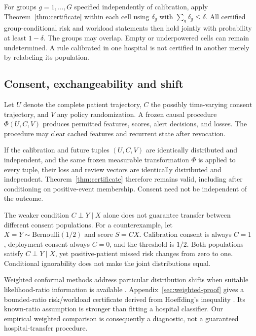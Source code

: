 \begin{corollary}
For groups $g=1,\ldots,G$ specified independently of calibration, apply Theorem~\ref{thm:certificate} within each cell using $\delta_g$ with $\sum_g\delta_g\le\delta$. All certified group-conditional risk and workload statements then hold jointly with probability at least $1-\delta$. The groups may overlap. Empty or underpowered cells can remain undetermined. A rule calibrated in one hospital is not certified in another merely by relabeling its population.
\end{corollary}

\subsection{Consent, exchangeability and shift}
Let $U$ denote the complete patient trajectory, $C$ the possibly time-varying consent trajectory, and $V$ any policy randomization. A frozen causal procedure $\Phi(U,C,V)$ produces permitted features, scores, alert decisions, and losses. The procedure may clear cached features and recurrent state after revocation.

\begin{proposition}\label{prop:consent}
If the calibration and future tuples $(U,C,V)$ are identically distributed and independent, and the same frozen measurable transformation $\Phi$ is applied to every tuple, their loss and review vectors are identically distributed and independent. Theorem~\ref{thm:certificate} therefore remains valid, including after conditioning on positive-event membership. Consent need not be independent of the outcome.
\end{proposition}
The weaker condition $C\perp Y\mid X$ alone does not guarantee transfer between different consent populations. For a counterexample, let $X=Y\sim\mathrm{Bernoulli}(1/2)$ and score $S=CX$. Calibration consent is always $C=1$, deployment consent always $C=0$, and the threshold is $1/2$. Both populations satisfy $C\perp Y\mid X$, yet positive-patient missed risk changes from zero to one. Conditional ignorability does not make the joint distributions equal.

Weighted conformal methods address particular distribution shifts when suitable likelihood-ratio information is available \citep{weighted}. Appendix~\ref{sec:weighted-proof} gives a bounded-ratio risk/workload certificate derived from Hoeffding's inequality \citep{hoeffding}. Its known-ratio assumption is stronger than fitting a hospital classifier. Our empirical weighted comparison is consequently a diagnostic, not a guaranteed hospital-transfer procedure.
